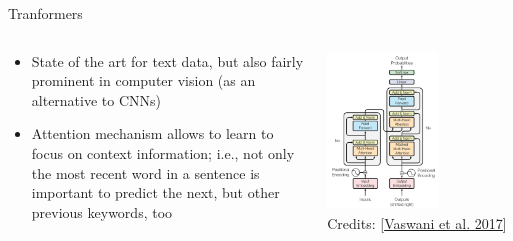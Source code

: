 \documentclass[aspectratio=169]{../latex_main/tntbeamer}  %
\begin{document}
        \begin{frame}{Tranformers}

        \begin{columns}

        \begin{column}{0.5\textwidth}

            \begin{itemize}
                \item State of the art for text data, but also fairly prominent in computer vision (as an alternative to CNNs)
                \item Attention mechanism allows to learn to focus on context information; i.e., not only the most recent word in a sentence is important to predict the next, but other previous keywords, too
            \end{itemize}

        \end{column}

        \begin{column}{0.5\textwidth}

        \centering
        \vspace*{-2em}
        \includegraphics[width=0.6\textwidth]{figure/transformer.png}\\
        Credits: [\href{https://arxiv.org/pdf/1706.03762}{Vaswani et al. 2017}]

        \end{column}
            
        \end{columns}
        


        \end{frame}
\end{document}
